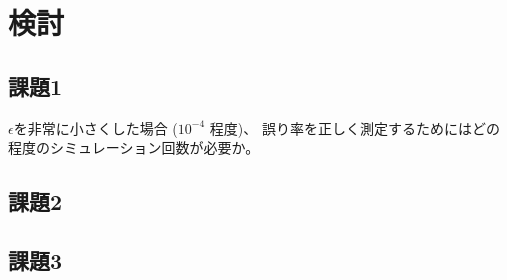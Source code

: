 \documentclass[12pt]{jarticle}
\begin{document}
\section{検討}
\subsection{課題1}
\begin{shadebox}
    $\epsilon$を非常に小さくした場合 ($10^{-4}$ 程度)、
    誤り率を正しく測定するためにはどの程度のシミュレーション回数が必要か。
\end{shadebox}

\subsection{課題2}
\begin{shadebox}

\end{shadebox}

\subsection{課題3}
\begin{shadebox}

\end{shadebox}

\clearpage
\appendix
\end{document}
